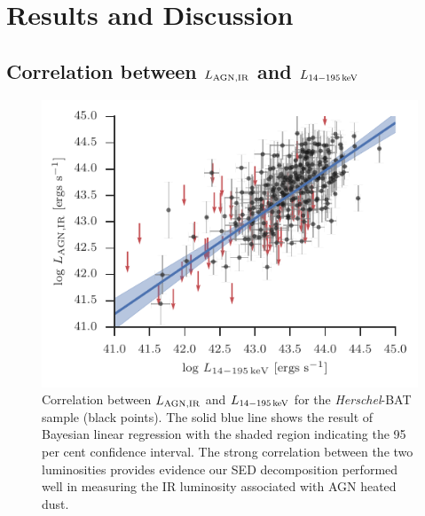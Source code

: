 \documentclass[fleqn, usenatbib]{mnras}
\newcommand{\herschel}{\emph{Herschel}}
\begin{document}
\section{Results and Discussion}

\subsection{Correlation between $L_{\rm AGN, IR}$ and $L_{\rm 14-195\,keV}$}\label{sec:lagnIR_lbat_correlation}

\begin{figure}
\includegraphics{figures/lagnIR_lbat_correlation}
\caption{Correlation between $L_{\rm AGN, IR}$ and $L_{\rm 14-195\,keV}$ for the \herschel-BAT sample (black points). The solid blue line shows the result of Bayesian linear regression with the shaded region indicating the 95 per cent confidence interval. The strong correlation between the two luminosities provides evidence our SED decomposition performed well in measuring the IR luminosity associated with AGN heated dust.\label{fig:lagnIR_lbat}}
\end{figure}
\end{document}
